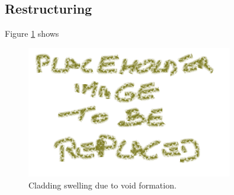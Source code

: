 \subsection{Restructuring}
Figure \ref{fig:restructuring} shows 

\begin{figure}[H]
\centering
\includegraphics[width=0.8\textwidth]{placeholder.png}
\caption{Cladding swelling due to void formation.}
\label{fig:restructuring}
\end{figure}
